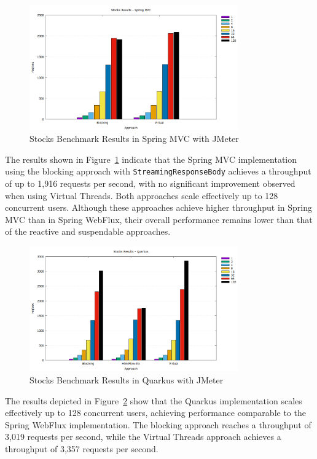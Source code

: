 \begin{figure}[h]
     \centering
     \includegraphics[width=0.8\textwidth]{./Graphs/stocks-springmvc-jmeter.png}
     \caption{Stocks Benchmark Results in Spring MVC with JMeter}\label{fig:stocks-springmvc-jmeter}
\end{figure}

The results shown in Figure~\ref{fig:stocks-springmvc-jmeter} indicate that the
Spring MVC implementation using the blocking approach with
\texttt{StreamingResponseBody} achieves a throughput of up to 1,916 requests
per second, with no significant improvement observed when using Virtual
Threads. Both approaches scale effectively up to 128 concurrent users. Although
these approaches achieve higher throughput in Spring MVC than in Spring
WebFlux, their overall performance remains lower than that of the reactive and
suspendable approaches.

\begin{figure}[h]
     \centering
     \includegraphics[width=0.8\textwidth]{./Graphs/stocks-quarkus-jmeter.png}
     \caption{Stocks Benchmark Results in Quarkus with JMeter}\label{fig:stocks-quarkus-jmeter}
\end{figure}

The results depicted in Figure~\ref{fig:stocks-quarkus-jmeter} show that the
Quarkus implementation scales effectively up to 128 concurrent users, achieving
performance comparable to the Spring WebFlux implementation. The blocking
approach reaches a throughput of 3,019 requests per second, while the Virtual
Threads approach achieves a throughput of 3,357 requests per second.

